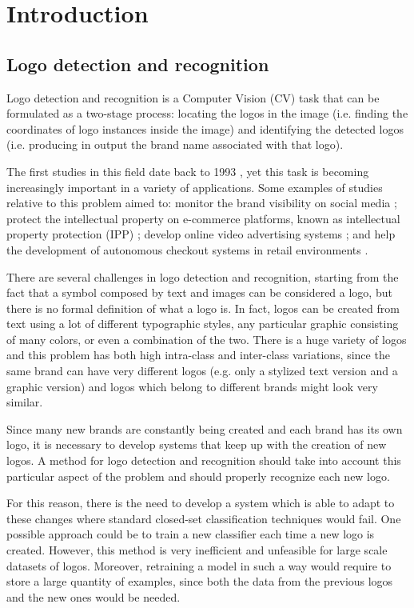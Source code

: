 \chapter{Introduction}
\label{chap:introduction}

\section{Logo detection and recognition}
\label{sec:logodet-intro}

Logo detection and recognition is a Computer Vision (CV) task that can be formulated as a two-stage process: locating the logos in the image (i.e. finding the coordinates of logo instances inside the image) and identifying the detected logos (i.e. producing in output the brand name associated with that logo).

The first studies in this field date back to 1993 \cite{doermann1993logo}, yet this task is becoming increasingly important in a variety of applications. Some examples of studies relative to this problem aimed to: monitor the brand visibility on social media \cite{7492197}; protect the intellectual property on e-commerce platforms, known as intellectual property protection (IPP) \cite{jin2020open}; develop online video advertising systems \cite{cheng2017video}; and help the development of autonomous checkout systems in retail environments \cite{mata2022standardsim}.

There are several challenges in logo detection and recognition, starting from the fact that a symbol composed by text and images can be considered a logo, but there is no formal definition of what a logo is. In fact, logos can be created from text using a lot of different typographic styles, any particular graphic consisting of many colors, or even a combination of the two.
There is a huge variety of logos and this problem has both high intra-class and inter-class variations, since the same brand can have very different logos (e.g. only a stylized text version and a graphic version) and logos which belong to different brands might look very similar.

Since many new brands are constantly being created and each brand has its own logo, it is necessary to develop systems that keep up with the creation of new logos. A method for logo detection and recognition should take into account this particular aspect of the problem and should properly recognize each new logo.

For this reason, there is the need to develop a system which is able to adapt to these changes where standard closed-set classification techniques would fail. One possible approach could be to train a new classifier each time a new logo is created. However, this method is very inefficient and unfeasible for large scale datasets of logos. Moreover, retraining a model in such a way would require to store a large quantity of examples, since both the data from the previous logos and the new ones would be needed.

